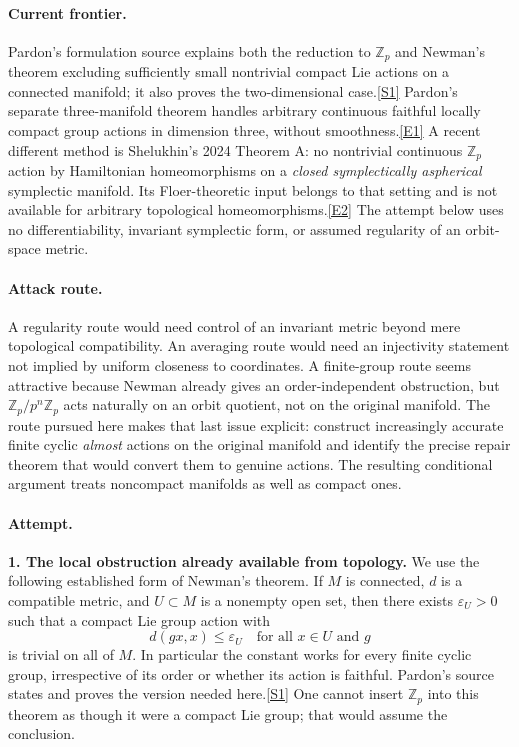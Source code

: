 \documentclass[11pt,a4paper]{article}
\newcommand{\Z}{\mathbb{Z}}
\newcommand{\sref}[2]{\hyperlink{source:#1:#2}{[S#2]}}
\newcommand{\eref}[2]{\hyperlink{extra:#1:#2}{[E#2]}}
\begin{document}
\paragraph{Current frontier.}
Pardon's formulation source explains both the reduction to $\Z_p$ and
Newman's theorem excluding sufficiently small nontrivial compact Lie
actions on a connected manifold; it also proves the two-dimensional
case.\sref{207}{1}
Pardon's separate three-manifold theorem handles arbitrary continuous
faithful locally compact group actions in dimension three, without
smoothness.\eref{207}{1}
A recent different method is Shelukhin's 2024 Theorem A: no nontrivial
continuous $\Z_p$ action by Hamiltonian homeomorphisms on a \emph{closed
symplectically aspherical} symplectic manifold. Its Floer-theoretic input
belongs to that setting and is not available for arbitrary topological
homeomorphisms.\eref{207}{2}
The attempt below uses no differentiability, invariant symplectic form,
or assumed regularity of an orbit-space metric.

\paragraph{Attack route.}
A regularity route would need control of an invariant metric beyond mere
topological compatibility. An averaging route would need an injectivity
statement not implied by uniform closeness to coordinates. A finite-group
route seems attractive because Newman already gives an order-independent
obstruction, but $\Z_p/p^n\Z_p$ acts naturally on an orbit quotient, not
on the original manifold. The route pursued here makes that last issue
explicit: construct increasingly accurate finite cyclic \emph{almost}
actions on the original manifold and identify the precise repair theorem
that would convert them to genuine actions. The resulting conditional
argument treats noncompact manifolds as well as compact ones.

\paragraph{Attempt.}
\textbf{1. The local obstruction already available from topology.}
We use the following established form of Newman's theorem. If $M$ is
connected, $d$ is a compatible metric, and $U\subset M$ is a nonempty
open set, then there exists $\varepsilon_U>0$ such that a compact Lie
group action with
\[
 d(gx,x)\le\varepsilon_U\quad\text{for all }x\in U\text{ and }g
\]
is trivial on all of $M$. In particular the constant works for every
finite cyclic group, irrespective of its order or whether its action
is faithful. Pardon's source states and proves the version needed
here.\sref{207}{1}
One cannot insert $\Z_p$ into this theorem as though it were a compact
Lie group; that would assume the conclusion.
\end{document}
